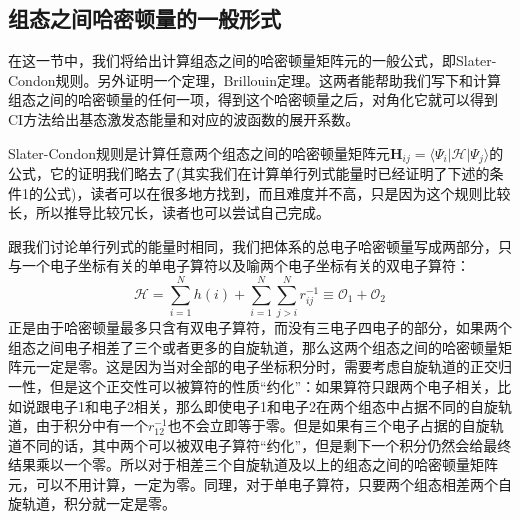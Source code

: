 \documentclass[12pt,a4paper,openany,twoside]{book}
\numberwithin{equation}{section}
\begin{document}
        \subsection{组态之间哈密顿量的一般形式}
          在这一节中，我们将给出计算组态之间的哈密顿量矩阵元的一般公式，即Slater-Condon规则。另外证明一个定理，Brillouin定理。这两者能帮助我们写下和计算组态之间的哈密顿量的任何一项，得到这个哈密顿量之后，对角化它就可以得到CI方法给出基态激发态能量和对应的波函数的展开系数。

          Slater-Condon规则是计算任意两个组态之间的哈密顿量矩阵元$\mathbf{H}_{ij} = \langle \Psi_i | \mathscr{H} | \Psi_j \rangle $的公式，它的证明我们略去了(其实我们在计算单行列式能量时已经证明了下述的条件1的公式)，读者可以在很多地方找到，而且难度并不高，只是因为这个规则比较长，所以推导比较冗长，读者也可以尝试自己完成。

          跟我们讨论单行列式的能量时相同，我们把体系的总电子哈密顿量写成两部分，只与一个电子坐标有关的单电子算符以及喻两个电子坐标有关的双电子算符：
          \begin{equation}
            \mathscr{H} = \sum_{i=1}^N h(i) +\sum_{i=1}^N\sum_{j>i}^N r_{ij}^{-1} \equiv \mathcal{O}_1+\mathcal{O}_2
          \end{equation}
          正是由于哈密顿量最多只含有双电子算符，而没有三电子四电子的部分，如果两个组态之间电子相差了三个或者更多的自旋轨道，那么这两个组态之间的哈密顿量矩阵元一定是零。这是因为当对全部的电子坐标积分时，需要考虑自旋轨道的正交归一性，但是这个正交性可以被算符的性质“约化”：如果算符只跟两个电子相关，比如说跟电子1和电子2相关，那么即使电子1和电子2在两个组态中占据不同的自旋轨道，由于积分中有一个$r_{12}^{-1}$也不会立即等于零。但是如果有三个电子占据的自旋轨道不同的话，其中两个可以被双电子算符“约化”，但是剩下一个积分仍然会给最终结果乘以一个零。所以对于相差三个自旋轨道及以上的组态之间的哈密顿量矩阵元，可以不用计算，一定为零。同理，对于单电子算符，只要两个组态相差两个自旋轨道，积分就一定是零。
\end{document}

